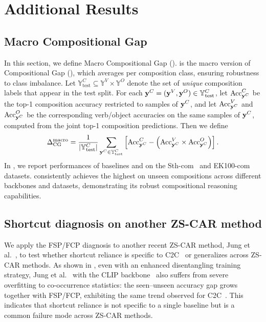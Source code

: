 \section{Additional Results}
\label{sec:additional_results}


\subsection{Macro Compositional Gap}
In this section, we define Macro Compositional Gap (\mcg{}).
\mcg{} is the macro version of Compositional Gap (\cg{}),  which averages \cg{} per composition class, ensuring robustness to class imbalance.
Let $\mathbb{Y}_{\text{test}}^{C} \subseteq \mathbb{Y}^V \times \mathbb{Y}^O$ denote the set of \emph{unique} composition labels that appear in the test split.
For each $\mathbf{y}^C=(\mathbf{y}^V,\mathbf{y}^O) \in \mathbb{Y}_{\text{test}}^{C}$, let $\mathrm{Acc}^C_{\mathbf{y}^C}$ be the top-1 composition accuracy restricted to samples of $\mathbf{y}^C$, and let $\mathrm{Acc}^V_{\mathbf{y}^C}$ and $\mathrm{Acc}^O_{\mathbf{y}^C}$ be the corresponding verb/object accuracies on the same samples of $\mathbf{y}^C$, computed from the joint top-1 composition predictions.
Then we define
\begin{equation}
\Delta_{\text{CG}}^{\text{macro}} = \frac{1}{|\mathbb{Y}^C_{\text{test}}|} \sum_{\mathbf{y}^C \in \mathbb{Y}^C_{\text{test}}} \left[ \text{Acc}^C_{\mathbf{y}^C} - \left( \text{Acc}^V_{\mathbf{y}^C} \times \text{Acc}^O_{\mathbf{y}^C} \right) \right].
\label{eq:mcg}
\end{equation}
In , we report \mcg{} performances of baselines and \ours{} on the Sth-com~\cite{li2024c2c} and EK100-com datasets.
\ours{} consistently achieves the highest \mcg{} on unseen compositions across different backbones and datasets, demonstrating its robust compositional reasoning capabilities.


\subsection{Shortcut diagnosis on another ZS-CAR method}

We apply the FSP/FCP diagnosis to another recent ZS-CAR method, Jung et al.~\cite{jung2025crr}, to test whether shortcut reliance is specific to C2C~\cite{li2024c2c} or generalizes across ZS-CAR methods.
As shown in , even with an enhanced disentangling training strategy, Jung et al.~\cite{jung2025crr} with the CLIP backbone~\cite{radford2021clip} also suffers from severe overfitting to co-occurrence statistics: the seen--unseen accuracy gap grows together with FSP/FCP, exhibiting the same trend observed for C2C~\cite{li2024c2c}.
This indicates that shortcut reliance is not specific to a single baseline but is a common failure mode across ZS-CAR methods.




